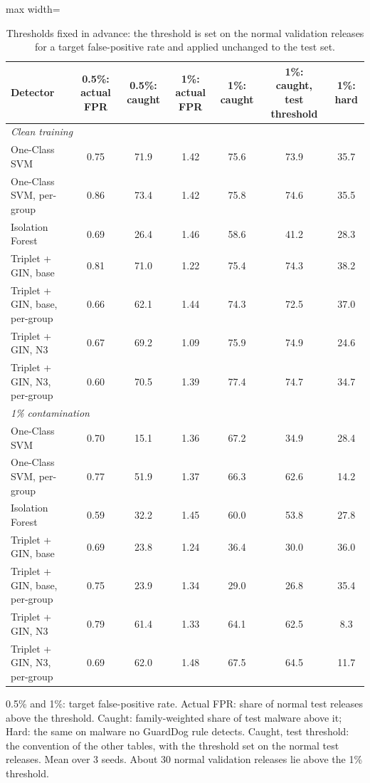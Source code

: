 \begin{table}[htbp]
\centering
\footnotesize
\caption{Thresholds fixed in advance: the threshold is set on the normal validation releases for a target false-positive rate and applied unchanged to the test set.}
\label{tab:deployment}
\begin{adjustbox}{max width=\linewidth}
\begin{tabular}{lcccccc}
\toprule
Detector & 0.5\%: actual FPR & 0.5\%: caught & 1\%: actual FPR & 1\%: caught & 1\%: caught, test threshold & 1\%: hard \\
\midrule
\multicolumn{7}{l}{\textit{Clean training}} \\
One-Class SVM & 0.75 & 71.9 & 1.42 & 75.6 & 73.9 & 35.7 \\
One-Class SVM, per-group & 0.86 & 73.4 & 1.42 & 75.8 & 74.6 & 35.5 \\
Isolation Forest & 0.69 & 26.4 & 1.46 & 58.6 & 41.2 & 28.3 \\
Triplet + GIN, base & 0.81 & 71.0 & 1.22 & 75.4 & 74.3 & 38.2 \\
Triplet + GIN, base, per-group & 0.66 & 62.1 & 1.44 & 74.3 & 72.5 & 37.0 \\
Triplet + GIN, N3 & 0.67 & 69.2 & 1.09 & 75.9 & 74.9 & 24.6 \\
Triplet + GIN, N3, per-group & 0.60 & 70.5 & 1.39 & 77.4 & 74.7 & 34.7 \\
\midrule
\multicolumn{7}{l}{\textit{1\% contamination}} \\
One-Class SVM & 0.70 & 15.1 & 1.36 & 67.2 & 34.9 & 28.4 \\
One-Class SVM, per-group & 0.77 & 51.9 & 1.37 & 66.3 & 62.6 & 14.2 \\
Isolation Forest & 0.59 & 32.2 & 1.45 & 60.0 & 53.8 & 27.8 \\
Triplet + GIN, base & 0.69 & 23.8 & 1.24 & 36.4 & 30.0 & 36.0 \\
Triplet + GIN, base, per-group & 0.75 & 23.9 & 1.34 & 29.0 & 26.8 & 35.4 \\
Triplet + GIN, N3 & 0.79 & 61.4 & 1.33 & 64.1 & 62.5 & 8.3 \\
Triplet + GIN, N3, per-group & 0.69 & 62.0 & 1.48 & 67.5 & 64.5 & 11.7 \\
\bottomrule
\end{tabular}
\end{adjustbox}
\par\smallskip
\parbox{0.95\linewidth}{\footnotesize 0.5\% and 1\%: target false-positive rate. Actual FPR: share of normal test releases above the threshold. Caught: family-weighted share of test malware above it; Hard: the same on malware no GuardDog rule detects. Caught, test threshold: the convention of the other tables, with the threshold set on the normal test releases. Mean over 3 seeds. About 30 normal validation releases lie above the 1\% threshold.}
\end{table}
